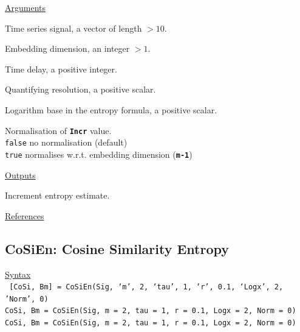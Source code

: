 \documentclass[12pt, a4paper, titlepage, openany]{book}
\begin{document}
\noindent \ul{Arguments}
\begin{description}[labelsep=1cm, labelwidth=2cm, nosep, style=multiline,leftmargin=3cm]\footnotesize
\item[\texttt{Sig}]		Time series signal, a vector of length $> 10$.
\item[\texttt{m}]		Embedding dimension, an integer $> 1$.
\item[\texttt{tau}]		Time delay, a positive integer.
\item[\texttt{R}]		Quantifying resolution, a positive scalar.
\item[\texttt{Logx}]	Logarithm base in the entropy formula, a positive scalar.
\item[\texttt{Norm}]	Normalisation of \texttt{\textbf{Incr}} value.\\
						\texttt{false} \hspace{10pt} no normalisation (default)\\
						\texttt{true} \hspace{15pt} normalises w.r.t. embedding dimension (\texttt{\textbf{m-1}})
\end{description}

\noindent \ul{Outputs}
\begin{description}[labelsep=1cm, labelwidth=2cm, nosep, style=multiline,leftmargin=3cm]\footnotesize
\item[\texttt{Incr}]	Increment entropy  estimate.
\end{description}

\noindent \ul{References}\hspace{1cm}
\cite{Incr1} \cite{Incr2} \cite{Incr3}



\newpage
\subsection{\normalsize CoSiEn: \hspace{15mm} Cosine Similarity Entropy}
\noindent\ul{Syntax} \vspace{6mm} \\ \noindent \texttt{\footnotesize
[CoSi, Bm] = CoSiEn(Sig, ‘m’, 2, ‘tau’, 1, ‘r’, 0.1, ‘Logx’, 2, 'Norm', 0) \\
CoSi, Bm  = CoSiEn(Sig, m = 2, tau = 1, r = 0.1, Logx = 2, Norm = 0) \\
CoSi, Bm  = CoSiEn(Sig, m = 2, tau = 1, r = 0.1, Logx = 2, Norm = 0)}
\end{document}
